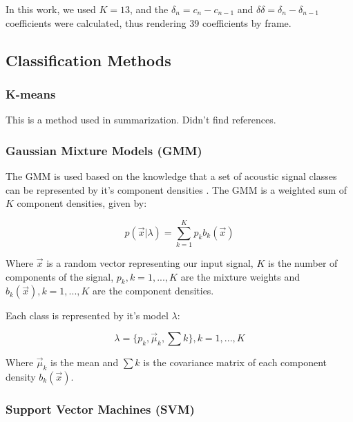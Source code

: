 \documentclass[12pt]{article}
\begin{document}
In this work, we used $K = 13$, and the $\delta_n = c_n - c_{n-1}$ and $\delta\delta = \delta_n - \delta_{n-1} $ coefficients were calculated, thus rendering 39 coefficients by frame.

\subsection{Classification Methods} \label{class:meth}

\subsubsection{K-means} \label{class:kmeans}

This is a method used in summarization. Didn't find references.

\subsubsection{Gaussian Mixture Models (GMM)} \label{class:gmm}


The GMM is used based on the knowledge that a set of acoustic signal classes can be represented by it's component densities \cite{reynolds1995robust}. The GMM is a weighted sum of $K$ component densities, given by:

\begin{equation}
	p(\vec{x}|\lambda) = \sum_{k=1}^{K} p_kb_k(\vec{x})
	\label{eq:gmm}
\end{equation}

Where $\vec{x}$ is a random vector representing our input signal, $K$ is the number of components of the signal, $p_k, k = 1,...,K$ are the mixture weights and $b_k(\vec{x}), k = 1,...,K$ are the component densities.

Each class is represented by it's model $\lambda$:

\begin{equation}
	\lambda = \{ p_k, \vec{\mu}_k, \sum k \}, k = 1,...,K
	\label{eq:lambda}
\end{equation}

Where $\vec{\mu}_k$ is the mean and $\sum k$ is the covariance matrix of each component density $b_k(\vec{x})$.



\subsubsection{Support Vector Machines (SVM)} \label{class:svm}
\end{document}
